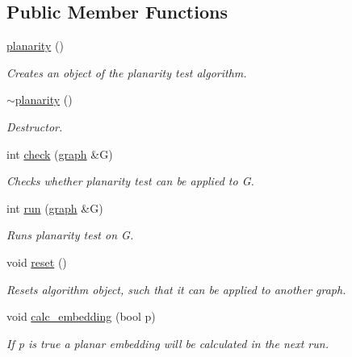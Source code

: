 \subsection*{Public Member Functions}
\begin{DoxyCompactItemize}
\item 
\mbox{\hyperlink{classplanarity_ab0377cf75279277a848f7e2eed507d00}{planarity}} ()
\begin{DoxyCompactList}\small\item\em Creates an object of the planarity test algorithm. \end{DoxyCompactList}\item 
\mbox{\label{classplanarity_a3e0c0f1a724191042947dfecc640bf05}} 
\mbox{\hyperlink{classplanarity_a3e0c0f1a724191042947dfecc640bf05}{$\sim$planarity}} ()
\begin{DoxyCompactList}\small\item\em Destructor. \end{DoxyCompactList}\item 
int \mbox{\hyperlink{classplanarity_ae06c471d957a116aad14e338c341f8b1}{check}} (\mbox{\hyperlink{classgraph}{graph}} \&G)
\begin{DoxyCompactList}\small\item\em Checks whether planarity test can be applied to {\ttfamily G}. \end{DoxyCompactList}\item 
int \mbox{\hyperlink{classplanarity_a93232e765c08dd2a4c00d192bb48b5fc}{run}} (\mbox{\hyperlink{classgraph}{graph}} \&G)
\begin{DoxyCompactList}\small\item\em Runs planarity test on {\ttfamily G}. \end{DoxyCompactList}\item 
void \mbox{\hyperlink{classplanarity_aca500e3d46a99c6231aff86afa2a71b1}{reset}} ()
\begin{DoxyCompactList}\small\item\em Resets algorithm object, such that it can be applied to another graph. \end{DoxyCompactList}\item 
void \mbox{\hyperlink{classplanarity_a1679e285a7135b48b572764f5e8e773d}{calc\+\_\+embedding}} (bool p)
\begin{DoxyCompactList}\small\item\em If {\ttfamily p} is true a planar embedding will be calculated in the next run. \end{DoxyCompactList}\item 

\end{DoxyCompactItemize}
